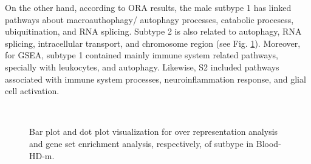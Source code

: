 On the other hand, according to ORA results, the male sutbype 1 has linked pathways about macroauthophagy/ autophagy processes, catabolic procesess, ubiquitination, and RNA splicing. Subtype 2 is also related to autophagy, RNA splicing, intracellular transport, and chromosome region (see Fig. \ref{fig:path-blood-m-sub}). Moreover, for GSEA, subtype 1 contained mainly immune system related pathways, specially with leukocytes, and autophagy. Likewise, S2 included pathways associated with immune system processes, neuroinflammation response, and glial cell activation. 

\begin{figure}[!ht]%
    \centering
    \qquad
    \\
    \qquad
\caption{Bar plot and dot plot visualization for over representation analysis and gene set enrichment analysis, respectively, of sutbype in Blood-HD-m.}
\label{fig:path-blood-m-sub}%
\end{figure}

